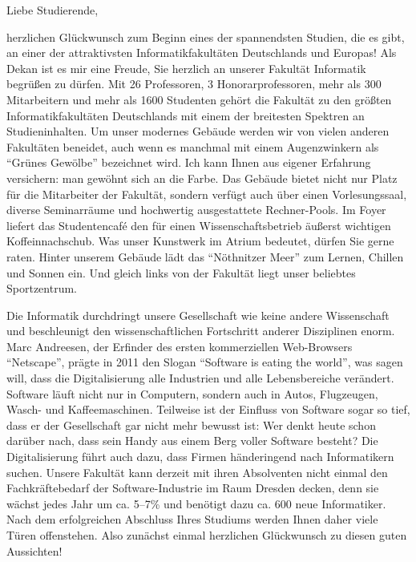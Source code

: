 {\fontsize{9.5pt}{11}\selectfont

Liebe Studierende,

herzlichen Glückwunsch zum Beginn eines der spannendsten Studien, die es gibt, an einer der attraktivsten Informatikfakultäten Deutschlands und Europas! Als Dekan ist es mir eine Freude, Sie herzlich an unserer Fakultät Informatik begrüßen zu dürfen. Mit 26 Professoren, 3 Honorarprofessoren, mehr als 300 Mitarbeitern und mehr als 1600 Studenten gehört die Fakultät zu den größten Informatikfakultäten Deutschlands mit einem der breitesten Spektren an Studieninhalten. Um unser modernes Gebäude werden wir von vielen anderen Fakultäten beneidet, auch wenn es manchmal mit einem Augenzwinkern als \enquote{Grünes Gewölbe} bezeichnet wird. Ich kann Ihnen aus eigener Erfahrung versichern: man gewöhnt sich an die Farbe. Das Gebäude bietet nicht nur Platz für die Mitarbeiter der Fakultät, sondern verfügt auch über einen Vorlesungssaal, diverse Seminarräume und hochwertig ausgestattete Rechner-Pools. Im Foyer liefert das Studentencafé \ascii{} den für einen Wissenschaftsbetrieb äußerst wichtigen Koffeinnachschub. Was unser Kunstwerk im Atrium bedeutet, dürfen Sie gerne raten. Hinter unserem Gebäude lädt das \enquote{Nöthnitzer Meer} zum Lernen, Chillen und Sonnen ein. Und gleich links von der Fakultät liegt unser beliebtes Sportzentrum.

Die Informatik durchdringt unsere Gesellschaft wie keine andere Wissenschaft und beschleunigt den wissenschaftlichen Fortschritt anderer Disziplinen enorm. Marc Andreesen, der Erfinder des ersten kommerziellen Web-Browsers \enquote{Netscape}, prägte in 2011 den Slogan \enquote{Software is eating the world}, was sagen will, dass die Digitalisierung alle Industrien und alle Lebensbereiche verändert. Software läuft nicht nur in Computern, sondern auch in Autos, Flugzeugen, Wasch- und Kaffeemaschinen. Teilweise ist der Einfluss von Software sogar so tief, dass er der Gesellschaft gar nicht mehr bewusst ist: Wer denkt heute schon darüber nach, dass sein Handy aus einem Berg voller Software besteht? Die Digitalisierung führt auch dazu, dass Firmen händeringend nach Informatikern suchen. Unsere Fakultät kann derzeit mit ihren Absolventen nicht einmal den Fachkräftebedarf der Software-Industrie im Raum Dresden decken, denn sie wächst jedes Jahr um ca. 5--7\% und benötigt dazu ca. 600 neue Informatiker. Nach dem erfolgreichen Abschluss Ihres Studiums werden Ihnen daher viele Türen offenstehen. Also zunächst einmal herzlichen Glückwunsch zu diesen guten Aussichten!

}
